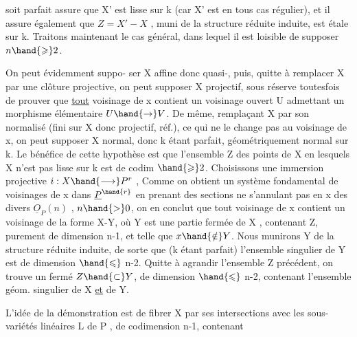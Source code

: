 
 soit parfait assure que X' est lisse sur k (car X' est en tous cas
régulier), et il assure également que $Z = X' - X$ , muni de la structure
réduite induite, est étale sur k. Traitons maintenant le cas général,
dans lequel il est loisible de supposer $n \hand{\geqslant} 2$.

 On peut évidemment suppo-%
ser X  affine donc quasi-, puis, quitte à remplacer X
par une clôture projective, on peut supposer X projectif, sous réserve
toutesfois de prouver que \uline{tout} voisinage de x contient un voisinage
ouvert U admettant un morphisme élémentaire $U \hand{\to} V$. De même, remplaçant
X par son normalisé (fini sur X donc projectif, réf.), ce qui ne le
change pas au voisinage de x, on peut supposer X normal, donc k étant
parfait, géométriquement normal sur k.  Le
bénéfice de cette hypothèse est que l'ensemble Z des points de X en
lesquels X n'est pas lisse sur k est de codim $\hand{\geqslant} 2$. 
Choisissons une immersion projective $i : X \hand{\longrightarrow} P^r$ , 
 Comme on obtient un système
fondamental de voisinages de x dans $\underline{P}^{\hand{r}}$ en prenant des sections ne
s'annulant pas en x des divers $\underline{O}_P(n)$ , $n \hand{>} 0$, on en conclut que tout
voisinage de x contient un voisinage de la forme X-Y, où Y est une
partie fermée de X , contenant Z, purement de dimension n-1, et telle que
$x \hand{\notin} Y$. Nous munirons Y de la structure réduite induite, de sorte que
(k étant parfait) l'ensemble singulier de Y est de dimension $\hand{\leqslant}$ n-2. 
Quitte à agrandir l'ensemble Z précédent, on trouve un fermé $Z \hand{\subset} Y$, de
dimension $\hand{\leqslant}$ n-2, contenant l'ensemble géom. singulier de X \uline{et} de Y.

L'idée de la démonstration est de fibrer X par ses intersections
avec les sous-variétés linéaires L de P , de codimension n-1, contenant

